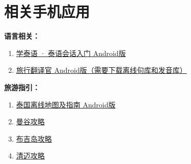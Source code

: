 \documentclass[utf-8,10pt]{ctexart}
\begin{document}
\section{相关手机应用}
\noindent
\textbf{语言相关：}
\begin{enumerate}
\item \href{http://voyager2718.github.io/APK/com.bravolang.thai.apk}{学泰语 · 泰语会话入门 Android版}
\item \href{http://voyager2718.github.io/APK/travel.translator.apk}{旅行翻译官 Android版（需要下载离线句库和发音库）}
\end{enumerate}
\textbf{旅游指引：}
\begin{enumerate}
\item \href{http://voyager2718.github.io/APK/off.guide.maps.thailand.apk}{泰国离线地图及指南 Android版}
\item \href{http://qiugonglue.com/app/2}{曼谷攻略}
\item \href{http://qiugonglue.com/app/3}{布吉岛攻略}
\item \href{http://qiugonglue.com/app/4}{清迈攻略}
\end{enumerate}
\end{document}

